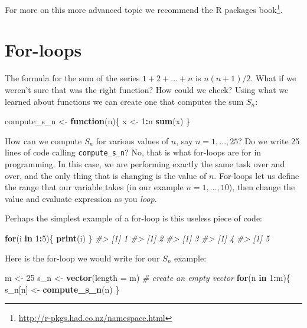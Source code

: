 \documentclass[
]{krantz}
\newenvironment{Shaded}{\begin{snugshade}}{\end{snugshade}}
\newcommand{\CommentTok}[1]{\textcolor[rgb]{0.37,0.37,0.37}{\textit{#1}}}
\newcommand{\ControlFlowTok}[1]{\textcolor[rgb]{0.27,0.27,0.27}{\textbf{#1}}}
\newcommand{\DataTypeTok}[1]{\textcolor[rgb]{0.27,0.27,0.27}{#1}}
\newcommand{\DecValTok}[1]{\textcolor[rgb]{0.06,0.06,0.06}{#1}}
\newcommand{\KeywordTok}[1]{\textcolor[rgb]{0.27,0.27,0.27}{\textbf{#1}}}
\newcommand{\NormalTok}[1]{#1}
\newcommand{\OperatorTok}[1]{\textcolor[rgb]{0.43,0.43,0.43}{\textbf{#1}}}
\newcommand{\StringTok}[1]{\textcolor[rgb]{0.5,0.5,0.5}{#1}}
\begin{document}
For more on this more advanced topic we recommend the R packages book\footnote{\url{http://r-pkgs.had.co.nz/namespace.html}}.

\hypertarget{for-loops}{%
\section{For-loops}\label{for-loops}}

The formula for the sum of the series \(1+2+\dots+n\) is \(n(n+1)/2\). What if we weren't sure that was the right function? How could we check? Using what we learned about functions we can create one that computes the sum \(S_n\):

\begin{Shaded}
\begin{Highlighting}[]
\NormalTok{compute_s_n <-}\StringTok{ }\ControlFlowTok{function}\NormalTok{(n)\{}
\NormalTok{  x <-}\StringTok{ }\DecValTok{1}\OperatorTok{:}\NormalTok{n}
  \KeywordTok{sum}\NormalTok{(x)}
\NormalTok{\}}
\end{Highlighting}
\end{Shaded}

How can we compute \(S_n\) for various values of \(n\), say \(n=1,\dots,25\)? Do we write 25 lines of code calling \texttt{compute\_s\_n}? No, that is what for-loops are for in programming. In this case, we are performing exactly the same task over and over, and the only thing that is changing is the value of \(n\). For-loops let us define the range that our variable takes (in our example \(n=1,\dots,10\)), then change the value and evaluate expression as you \emph{loop}.

Perhaps the simplest example of a for-loop is this useless piece of code:

\begin{Shaded}
\begin{Highlighting}[]
\ControlFlowTok{for}\NormalTok{(i }\ControlFlowTok{in} \DecValTok{1}\OperatorTok{:}\DecValTok{5}\NormalTok{)\{}
  \KeywordTok{print}\NormalTok{(i)}
\NormalTok{\}}
\CommentTok{#> [1] 1}
\CommentTok{#> [1] 2}
\CommentTok{#> [1] 3}
\CommentTok{#> [1] 4}
\CommentTok{#> [1] 5}
\end{Highlighting}
\end{Shaded}

Here is the for-loop we would write for our \(S_n\) example:

\begin{Shaded}
\begin{Highlighting}[]
\NormalTok{m <-}\StringTok{ }\DecValTok{25}
\NormalTok{s_n <-}\StringTok{ }\KeywordTok{vector}\NormalTok{(}\DataTypeTok{length =}\NormalTok{ m) }\CommentTok{# create an empty vector}
\ControlFlowTok{for}\NormalTok{(n }\ControlFlowTok{in} \DecValTok{1}\OperatorTok{:}\NormalTok{m)\{}
\NormalTok{  s_n[n] <-}\StringTok{ }\KeywordTok{compute_s_n}\NormalTok{(n)}
\NormalTok{\}}
\end{Highlighting}
\end{Shaded}
\end{document}

